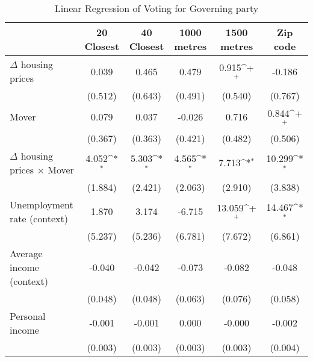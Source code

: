 \begin{table}[htbp]\centering
\def\sym#1{\ifmmode^{#1}\else\(^{#1}\)\fi}
\caption{Linear Regression of Voting for Governing party } \label{logitinter}
\begin{tabular}{l*{5}{c}}
\hline\hline
                    &\multicolumn{1}{c}{20 Closest}&\multicolumn{1}{c}{40 Closest}&\multicolumn{1}{c}{1000 metres}&\multicolumn{1}{c}{1500 metres}&\multicolumn{1}{c}{Zip code}\\
\hline
$\Delta$ housing prices&       0.039       &       0.465       &       0.479       &       0.915\sym{+}&      -0.186       \\
                    &     (0.512)       &     (0.643)       &     (0.491)       &     (0.540)       &     (0.767)       \\
[1em]
Mover               &       0.079       &       0.037       &      -0.026       &       0.716       &       0.844\sym{+}\\
                    &     (0.367)       &     (0.363)       &     (0.421)       &     (0.482)       &     (0.506)       \\
[1em]
$\Delta$ housing prices $\times$ Mover&       4.052\sym{*}&       5.303\sym{*}&       4.565\sym{*}&       7.713\sym{*}&      10.299\sym{*}\\
                    &     (1.884)       &     (2.421)       &     (2.063)       &     (2.910)       &     (3.838)       \\
[1em]
Unemployment rate (context)&       1.870       &       3.174       &      -6.715       &      13.059\sym{+}&      14.467\sym{*}\\
                    &     (5.237)       &     (5.236)       &     (6.781)       &     (7.672)       &     (6.861)       \\
[1em]
Average income (context)&      -0.040       &      -0.042       &      -0.073       &      -0.082       &      -0.048       \\
                    &     (0.048)       &     (0.048)       &     (0.063)       &     (0.076)       &     (0.058)       \\
[1em]
Personal income     &      -0.001       &      -0.001       &       0.000       &      -0.000       &      -0.002       \\
                    &     (0.003)       &     (0.003)       &     (0.003)       &     (0.003)       &     (0.004)       \\

\end{tabular}
\end{table}
